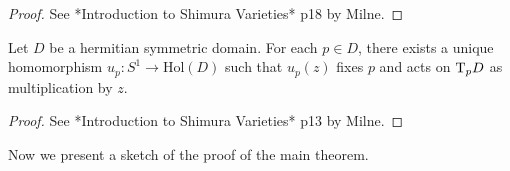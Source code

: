\begin{proof}
See *Introduction to Shimura Varieties* p18 by Milne.
\end{proof}

\begin{lemma}
 \label{lemma-5}
 Let $D$ be a hermitian symmetric domain. For each $p \in D$, there exists a unique homomorphism $u_p: S^1 \to \text{Hol}(D)$ such that $u_p(z)$ fixes $p$ and acts on $\text T_p D$ as multiplication by $z$.
\end{lemma} 

\begin{proof}
See *Introduction to Shimura Varieties* p13 by Milne.
\end{proof}

Now we present a sketch of the proof of the main theorem.

